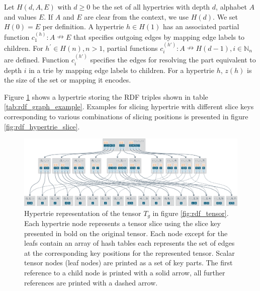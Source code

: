 \begin{definition}
	\label{def:bht}
	Let $H(d, A, E)$ with $d \geq 0$ be the set of all hypertries with depth $d$, alphabet $A$ and values $E$.
	If $A$ and $E$ are clear from the context, we use $H(d)$.
	We set $H(0) = E$ per definition. 
	A hypertrie $h\in H(1)$ has an associated partial function $c^{(h)}_1: A\nrightarrow E$ that specifies outgoing edges by mapping edge labels to children.
	For $ h^{'} \in H(n), n>1 $, partial functions $c^{(h')}_i: A \nrightarrow H(d-1), i \in \mathbb{N}_{n}$ are defined.
	Function $c^{(h')}_i$ specifies the edges for resolving the part equivalent to depth $i$ in a trie by mapping edge labels to children.
	For a hypertrie $h$, $z(h)$ is the size of the set or mapping it encodes.
\end{definition}

Figure \ref{fig:rdf_hypertrie} shows a hypertrie storing the RDF triples shown in table \ref{tab:rdf_graph_example}. Examples for slicing hypertrie with different slice keys corresponding to various combinations of slicing positions is presented in figure \ref{fig:rdf_hypertrie_slice}. \\

\begin{figure}
		\centering
		\includegraphics[scale=0.78]{figures/chapter2/hypertrie4}
		\caption{Hypertrie representation of the tensor $T_g$ in figure \ref{fig:rdf_tensor}. Each hypertrie node represents a tensor slice using the slice key presented in bold on the original tensor. Each node except for the leafs contain an array of hash tables each represents the set of edges at the corresponding key positions for the represented tensor. Scalar tensor nodes (leaf nodes) are printed as a set of key parts. The first reference to a child node is printed with a solid arrow, all further references are printed with a dashed arrow.}
		\label{fig:rdf_hypertrie}
\end{figure}

